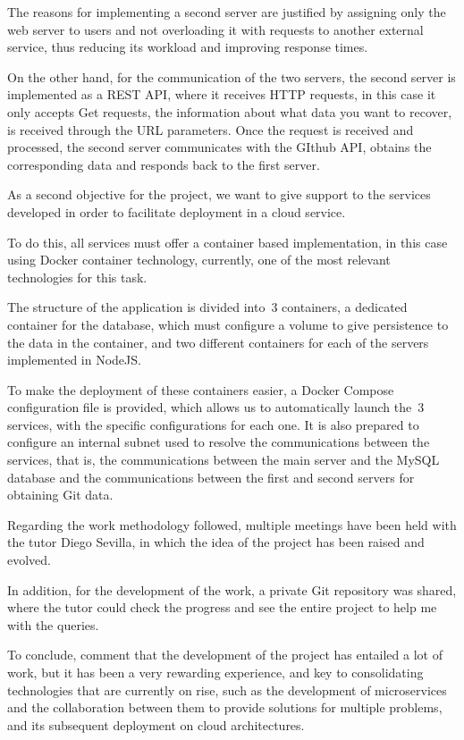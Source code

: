 The reasons for implementing a second server are justified by
assigning only the web server to users and not overloading it with
requests to another external service, thus reducing its workload and
improving response times.

On the other hand, for the communication of the two servers, the
second server is implemented as a REST API, where it receives HTTP
requests, in this case it only accepts Get requests, the information
about what data you want to recover, is received through the URL
parameters. Once the request is received and processed, the second
server communicates with the GIthub API, obtains the corresponding
data and responds back to the first server.

As a second objective for the project, we want to give support to the
services developed in order to facilitate deployment in a cloud
service.

To do this, all services must offer a container based implementation,
in this case using Docker\cite{Docker} container technology, currently, one of
the most relevant technologies for this task.

The structure of the application is divided into~3 containers, a
dedicated container for the database, which must configure a volume to
give persistence to the data in the container, and two different
containers for each of the servers implemented in NodeJS.

To make the deployment of these containers easier, a Docker Compose
configuration file is provided, which allows us to automatically
launch the~3 services, with the specific configurations for each one.
It is also prepared to configure an internal subnet used to resolve
the communications between the services, that is, the communications
between the main server and the MySQL database and the communications
between the first and second servers for obtaining Git data.

Regarding the work methodology followed, multiple meetings have been
held with the tutor Diego Sevilla, in which the idea of the project
has been raised and evolved.


In addition, for the development of the work, a private Git repository
was shared, where the tutor could check the progress and see the
entire project to help me with the queries.

To conclude, comment that the development of the project has entailed
a lot of work, but it has been a very rewarding experience, and key to
consolidating technologies that are currently on rise, such as the
development of microservices and the collaboration between them to
provide solutions for multiple problems, and its subsequent deployment
on cloud architectures.

